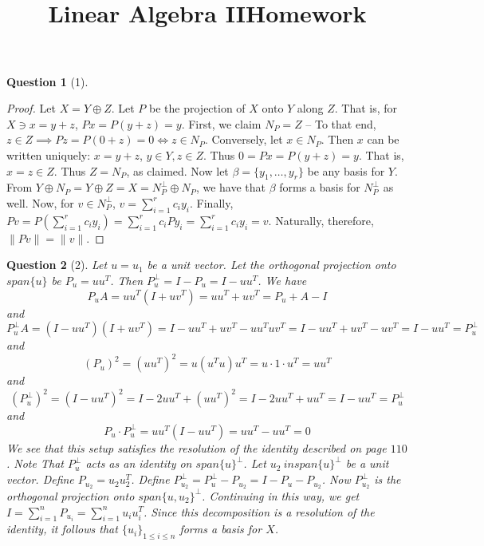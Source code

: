 \documentclass[11pt]{article}
\title{\vspace{-50pt}
\Huge \name
\\\vspace{20pt}
\huge Linear Algebra II\hfill Homework \hw}
\author{}
\date{}
\theoremstyle{quest}
\newtheorem*{question}{Question}
\begin{document}
\maketitle

\begin{question}[1]
\end{question}
\begin{proof}
Let $X = Y \oplus Z$. Let $P$ be the projection of $X$ onto $Y$ along $Z$. That is, for $X \ni x = y + z$, $Px = P(y+z) = y$. First, we claim $N_P = Z$ -- To that end, $z \in Z \implies Pz = P(0 + z) = 0 \iff z \in N_P$. Conversely, let $x \in N_P$. Then $x$ can be written uniquely: $x = y + z$, $y \in Y, z \in Z$. Thus $0 = Px = P(y+z) = y$. That is, $x = z \in Z$. Thus $Z = N_P$, as claimed. Now let $\beta = \{y_1, \ldots, y_r\}$ be any basis for $Y$. From $Y \oplus N_P = Y \oplus Z = X = N_P^{\perp} \oplus N_P$, we have that $\beta$ forms a basis for $N_P^{\perp}$ as well. Now, for $v \in N_P^{\perp}$, $v = \sum_{i=1}^r c_iy_i$. Finally, $Pv = P(\sum_{i=1}^r c_iy_i) = \sum_{i=1}^r c_iPy_i = \sum_{i=1}^r c_iy_i = v$. Naturally, therefore, $\|Pv\| = \|v\|$.
\end{proof}

\begin{question}[2]
Let $u = u_1$ be a unit vector. Let the orthogonal projection onto $span\{u\}$ be $P_u = uu^T$. Then $P_u^{\perp} = I - P_u = I - uu^T$. We have
$$P_u A = uu^T(I + uv^T) = uu^T + uv^T = P_u + A - I$$
and
$$P_u^{\perp} A = (I - uu^T)(I + uv^T) = I - uu^T + uv^T - uu^Tuv^T = I - uu^T + uv^T - uv^T = I - uu^T = P_u^{\perp}$$
and
$$(P_u)^2 = (uu^T)^2 = u(u^Tu)u^T = u \cdot 1 \cdot u^T = uu^T$$
and
$$(P_u^{\perp})^2 = (I - uu^T)^2 = I - 2uu^T + (uu^T)^2 = I - 2uu^T + uu^T = I - uu^T = P_u^{\perp}$$
and
$$P_u \cdot P_u^{\perp} = uu^T(I - uu^T) = uu^T - uu^T = 0$$
We see that this setup satisfies the resolution of the identity described on page $110$.
Note That $P_u^{\perp}$ acts as an identity on $span\{u\}^{\perp}$. Let $u_2 \ in span\{u\}^{\perp}$ be a unit vector. Define $P_{u_2} = u_2 u_2^T$. Define $P_{u_2}^{\perp} = P_{u}^{\perp} - P_{u_2} = I - P_u - P_{u_2}$. Now $P_{u_2}^{\perp}$ is the orthogonal projection onto $span\{u, u_2\}^{\perp}$. Continuing in this way, we get $I = \sum_{i=1}^n P_{u_i} = \sum_{i=1}^n u_i u_i^T$. Since this decomposition is a resolution of the identity, it follows that $\{u_i\}_{1 \le i \le n}$ forms a basis for $X$.
\end{question}
\end{document}
